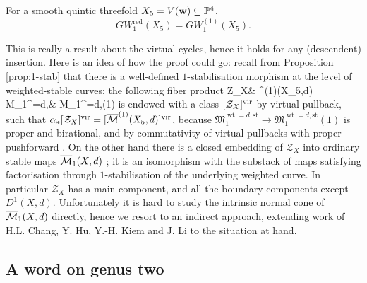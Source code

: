 \begin{thm}\cite{BCM}\label{thm:redvscusp}
 For a smooth quintic threefold $X_5=V(\mathbf w)\subseteq \mathbb P^4$, \[GW_1^{\mathrm{red}}(X_5)=GW_1^{(1)}(X_5).\]
\end{thm}
This is really a result about the virtual cycles, hence it holds for any (descendent) insertion. Here is an idea of how the proof could go: recall from Proposition \ref{prop:1-stab} that there is a well-defined $1$-stabilisation morphism at the level of weighted-stable curves; the following fiber product
\bcd
\mathcal Z_X\ar[r,"\alpha"]\ar[d] & \oM^{(1)}(X_5,d)\ar[d] \\
\mathfrak M_{1}^{=d,}\ar[r] & \mathfrak M_{1}^{=d,}(1)
\ecd
is endowed with a class $[\mathcal Z_X]^{\mathrm{vir}}$ by virtual pullback, such that $\alpha_*[\mathcal Z_X]^{\mathrm{vir}}=[\overline{\mathcal{M}}^{(1)}(X_5,d)]^{\mathrm{vir}}$, because $\mathfrak M_{1}^{\operatorname{wt}=d,\text{st}}\to \mathfrak M_{1}^{\operatorname{wt}=d,\text{st}}(1)$ is proper \cite[Lemma 4.19]{BCM} and birational, and by commutativity of virtual pullbacks with proper pushforward \cite{Manolache-Pull}. On the other hand there is a closed embedding of $\mathcal Z_X$ into ordinary stable maps $\overline{\mathcal{M}}_1(X,d)$ \cite[Lemma 4.13]{BCM}; it is an isomorphism with the substack of maps satisfying factorisation through $1$-stabilisation of the underlying weighted curve. In particular $\mathcal Z_X$ has a main component, and all the boundary components except $D^1(X,d)$. Unfortunately it is hard to study the intrinsic normal cone of $\overline{\mathcal{M}}_1(X,d)$ directly, hence we resort to an indirect approach, extending work of H.L. Chang, Y. Hu, Y.-H. Kiem and J. Li to the situation at hand.

\subsection{A word on genus two}

